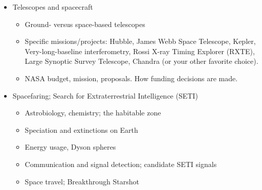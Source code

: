 \documentclass[11pt]{article}
\begin{document}
\begin{itemize}[noitemsep]
    \item Telescopes and spacecraft
        \begin{itemize}[noitemsep]
            \item Ground- versus space-based telescopes
            \item Specific missions/projects: Hubble, James Webb Space Telescope, Kepler, Very-long-baseline interferometry, Rossi X-ray Timing Explorer (RXTE), Large Synoptic Survey Telescope, Chandra (or your other favorite choice).
            \item NASA budget, mission, proposals.  How funding decisions are made.
        \end{itemize}

    \item Spacefaring; Search for Extraterrestrial Intelligence (SETI)
    \begin{itemize}[noitemsep]
        \item Astrobiology, chemistry; the habitable zone
        \item Speciation and extinctions on Earth
        \item Energy usage, Dyson spheres
        \item Communication and signal detection; candidate SETI signals
        \item Space travel; Breakthrough Starshot
    \end{itemize}


\end{itemize}
\end{document}
